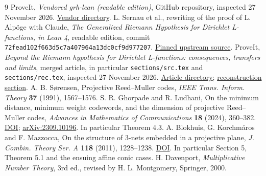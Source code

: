 \documentclass[11pt]{article}
\theoremstyle{remark}\newtheorem{remark}[theorem]{Remark}
\begin{document}
\begin{thebibliography}{9}
 ProveIt, \emph{Vendored grh-lean (readable edition)}, GitHub repository, inspected 27 November 2026. \href{https://github.com/VladimirReshetnikov/ProveIt/tree/main/Analysis/GeneralizedRiemannHypothesis/vendor/grh-lean}{Vendor directory}.
 L. Sernau et al., rewriting of the proof of L. Alp\"oge with Claude, \emph{The Generalized Riemann Hypothesis for Dirichlet L-functions, in Lean 4}, readable edition, commit \texttt{72fead102f663d5c7a407964a13dc0cf9d977207}. \href{https://github.com/lsernau/grh-lean/tree/72fead102f663d5c7a407964a13dc0cf9d977207/grh}{Pinned upstream source}.
 ProveIt, \emph{Beyond the Riemann hypothesis for Dirichlet L-functions: consequences, transfers and limits}, merged article, in particular \texttt{sections/src.tex} and \texttt{sections/rec.tex}, inspected 27 November 2026. \href{https://github.com/VladimirReshetnikov/ProveIt/tree/main/Analysis/GeneralizedRiemannHypothesis/Article}{Article directory}; \href{https://github.com/VladimirReshetnikov/ProveIt/blob/main/Analysis/GeneralizedRiemannHypothesis/Article/sections/rec.tex}{reconstruction section}.
 A. B. S\o rensen, Projective Reed--Muller codes, \emph{IEEE Trans. Inform. Theory} \textbf{37} (1991), 1567--1576.
 S. R. Ghorpade and R. Ludhani, On the minimum distance, minimum weight codewords, and the dimension of projective Reed--Muller codes, \emph{Advances in Mathematics of Communications} \textbf{18} (2024), 360--382. \href{https://doi.org/10.3934/amc.2023035}{DOI}; \href{https://arxiv.org/abs/2309.10196}{arXiv:2309.10196}. In particular Theorem 4.3.
 A. Blokhuis, G. Korchm\'aros and F. Mazzocca, On the structure of 3-nets embedded in a projective plane, \emph{J. Combin. Theory Ser. A} \textbf{118} (2011), 1228--1238. \href{https://doi.org/10.1016/j.jcta.2010.11.007}{DOI}. In particular Section 5, Theorem 5.1 and the ensuing affine conic cases.
 H. Davenport, \emph{Multiplicative Number Theory}, 3rd ed., revised by H. L. Montgomery, Springer, 2000.
\end{thebibliography}
\end{document}
